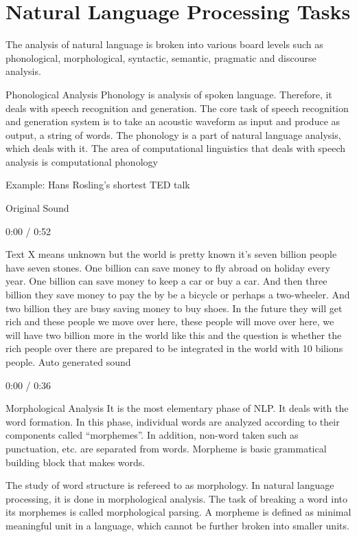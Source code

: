 \section{Natural Language Processing Tasks}

The analysis of natural language is broken into various board levels such as phonological, morphological, syntactic, semantic, pragmatic and discourse analysis.


Phonological Analysis
Phonology is analysis of spoken language. Therefore, it deals with speech recognition and generation. The core task of speech recognition and generation system is to take an acoustic waveform as input and produce as output, a string of words. The phonology is a part of natural language analysis, which deals with it. The area of computational linguistics that deals with speech analysis is computational phonology

Example: Hans Rosling’s shortest TED talk

Original Sound

0:00
/ 0:52


Text X means unknown but the world is pretty known it’s seven billion people have seven stones. One billion can save money to fly abroad on holiday every year. One billion can save money to keep a car or buy a car. And then three billion they save money to pay the by be a bicycle or perhaps a two-wheeler. And two billion they are busy saving money to buy shoes. In the future they will get rich and these people we move over here, these people will move over here, we will have two billion more in the world like this and the question is whether the rich people over there are prepared to be integrated in the world with 10 bilions people.
Auto generated sound

0:00
/ 0:36


Morphological Analysis
It is the most elementary phase of NLP. It deals with the word formation. In this phase, individual words are analyzed according to their components called “morphemes”. In addition, non-word taken such as punctuation, etc. are separated from words. Morpheme is basic grammatical building block that makes words.


The study of word structure is refereed to as morphology. In natural language processing, it is done in morphological analysis. The task of breaking a word into its morphemes is called morphological parsing. A morpheme is defined as minimal meaningful unit in a language, which cannot be further broken into smaller units.

